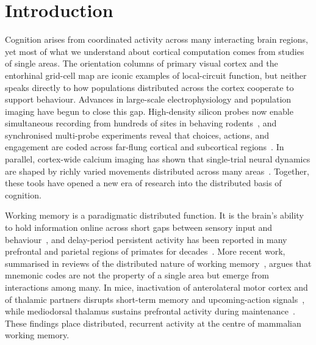 \section{Introduction}

Cognition arises from coordinated activity across many interacting brain regions, yet most of what we understand about cortical computation comes from studies of single areas. The orientation columns of primary visual cortex and the entorhinal grid-cell map are iconic examples of local-circuit function, but neither speaks directly to how populations distributed across the cortex cooperate to support behaviour. Advances in large-scale electrophysiology and population imaging have begun to close this gap. High-density silicon probes now enable simultaneous recording from hundreds of sites in behaving rodents~\cite{jun2017neuropixels}, and synchronised multi-probe experiments reveal that choices, actions, and engagement are coded across far-flung cortical and subcortical regions~\cite{steinmetz2019distributed}. In parallel, cortex-wide calcium imaging has shown that single-trial neural dynamics are shaped by richly varied movements distributed across many areas~\cite{musall2019single,stringer2019spontaneous}. Together, these tools have opened a new era of research into the distributed basis of cognition.

Working memory is a paradigmatic distributed function. It is the brain's ability to hold information online across short gaps between sensory input and behaviour~\cite{baddeley2012working}, and delay-period persistent activity has been reported in many prefrontal and parietal regions of primates for decades~\cite{funahashi1989mnemonic,goldmanrakic1995cellular}. More recent work, summarised in reviews of the distributed nature of working memory~\cite{christophel2017distributed,leavitt2017sustained}, argues that mnemonic codes are not the property of a single area but emerge from interactions among many. In mice, inactivation of anterolateral motor cortex and of thalamic partners disrupts short-term memory and upcoming-action signals~\cite{guo2017maintenance,inagaki2019discrete,gilad2018behavioral}, while mediodorsal thalamus sustains prefrontal activity during maintenance~\cite{bolkan2017thalamic,schmitt2017thalamic}. These findings place distributed, recurrent activity at the centre of mammalian working memory.

